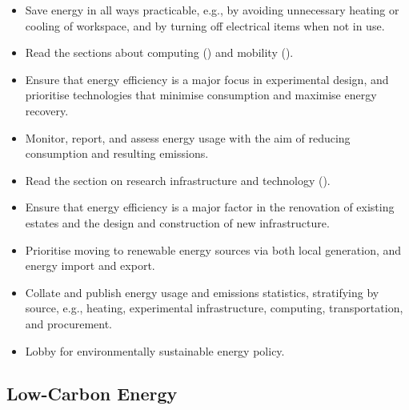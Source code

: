 \documentclass[../SustainableHEP.tex]{subfiles}
\begin{document}
\begin{reco2}{\currentname}
{
\begin{itemize}[leftmargin=6 mm]
\item Save energy in all ways practicable, e.g., by avoiding unnecessary heating or cooling of workspace, and by turning off electrical items when not in use.

\item Read the sections about computing () and mobility ().

\end{itemize}
}
{
\begin{itemize}[leftmargin=6 mm]
\item Ensure that energy efficiency is a major focus in experimental design, and prioritise technologies that minimise consumption and maximise energy recovery.

\item Monitor, report, and assess energy usage with the aim of reducing consumption and resulting emissions.

\item Read the section on research infrastructure and technology ().
\end{itemize}
}
{
\begin{itemize}[leftmargin=6 mm]
\item Ensure that energy efficiency is a major factor in the renovation of existing estates and the design and construction of new infrastructure.

\item Prioritise moving to renewable energy sources via both local generation, and energy import and export.

\item Collate and publish energy usage and emissions statistics, stratifying by source, e.g., heating, experimental infrastructure, computing, transportation, and procurement.

\item Lobby for environmentally sustainable energy policy.
\end{itemize}}

\end{reco2}


\newpage

\subsection{Low-Carbon Energy}
\label{sec:Ene-Transition}
\end{document}
